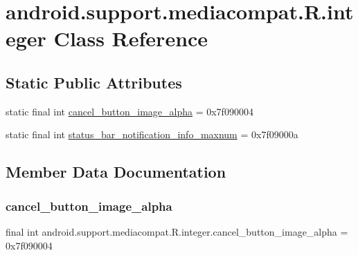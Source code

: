 \hypertarget{classandroid_1_1support_1_1mediacompat_1_1R_1_1integer}{}\section{android.\+support.\+mediacompat.\+R.\+integer Class Reference}
\label{classandroid_1_1support_1_1mediacompat_1_1R_1_1integer}
\subsection*{Static Public Attributes}
\begin{DoxyCompactItemize}
\item 
static final int \mbox{\hyperlink{classandroid_1_1support_1_1mediacompat_1_1R_1_1integer_a929b14d75f7d8e007bb733c78f2befd9}{cancel\+\_\+button\+\_\+image\+\_\+alpha}} = 0x7f090004
\item 
static final int \mbox{\hyperlink{classandroid_1_1support_1_1mediacompat_1_1R_1_1integer_a8eff02253ecf97f438548fe224122338}{status\+\_\+bar\+\_\+notification\+\_\+info\+\_\+maxnum}} = 0x7f09000a
\end{DoxyCompactItemize}


\subsection{Member Data Documentation}
\mbox{\label{classandroid_1_1support_1_1mediacompat_1_1R_1_1integer_a929b14d75f7d8e007bb733c78f2befd9}} 
\subsubsection{\texorpdfstring{cancel\+\_\+button\+\_\+image\+\_\+alpha}{cancel\_button\_image\_alpha}}
{\footnotesize\ttfamily final int android.\+support.\+mediacompat.\+R.\+integer.\+cancel\+\_\+button\+\_\+image\+\_\+alpha = 0x7f090004\hspace{0.3cm}{\ttfamily [static]}}

